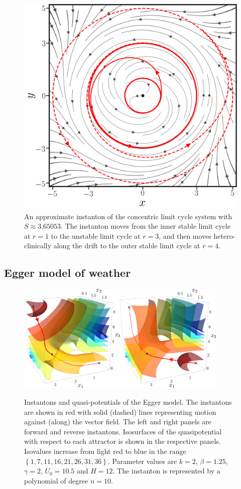 \begin{figure}[t]
\begin{centering}
\includegraphics[width=0.7\columnwidth]{figs_part1/pyritz/concentric_limit_cycle_instanton.png}
\par\end{centering}
\caption{An approximate instanton of the concentric limit cycle system with $S\approx3.65053$.
The instanton moves from the inner stable limit cycle at $r=1$ to the unstable limit cycle at $r=3$, and then moves hetero-clinically along the drift to the outer stable limit cycle at $r=4$.}
\label{fig:concentric}
\end{figure}

\subsection{Egger model of weather}

\begin{figure}
\begin{centering}
\includegraphics[width=0.9\textwidth]{figs_part1/pyritz/fig3.jpeg}
\par\end{centering}
\caption{Instantons and quasi-potentials of the Egger model. The instantons
are shown in red with solid (dashed) lines representing motion against
(along) the vector field. The left and right panels are forward and
reverse instantons. Isosurfaces of the quasipotential with respect
to each attractor is shown in the respective panels. Isovalues increase
from light red to blue in the range $\left\{ 1,7,11,16,21,26,31,36\right\} $.
Parameter values are $k=2$, $\beta=1.25$, $\gamma=2$, $U_{0}=10.5$
and $H=12$. The instanton is represented by a polynomial of degree
$n=10.$}
\centering{}\label{fig:eggers}
\end{figure}

